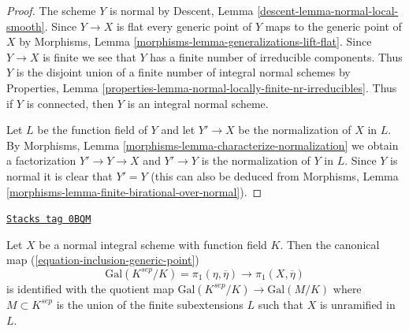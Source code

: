 \begin{proof}
The scheme $Y$ is normal by
Descent, Lemma \ref{descent-lemma-normal-local-smooth}.
Since $Y \to X$ is flat every generic point of $Y$ maps
to the generic point of $X$ by
Morphisms, Lemma \ref{morphisms-lemma-generalizations-lift-flat}.
Since $Y \to X$ is finite we see that $Y$ has a finite number
of irreducible components. Thus $Y$ is the disjoint union of
a finite number of integral normal schemes by
Properties, Lemma \ref{properties-lemma-normal-locally-finite-nr-irreducibles}.
Thus if $Y$ is connected, then $Y$ is an integral normal scheme.

\medskip\noindent
Let $L$ be the function field of $Y$ and let $Y' \to X$ be the normalization
of $X$ in $L$. By
Morphisms, Lemma \ref{morphisms-lemma-characterize-normalization}
we obtain a factorization $Y' \to Y \to X$ and $Y' \to Y$ is
the normalization of $Y$ in $L$. Since $Y$ is normal it is clear
that $Y' = Y$ (this can also be deduced from
Morphisms, Lemma \ref{morphisms-lemma-finite-birational-over-normal}).
\end{proof}

\begin{proposition}[Normal]
\label{pione-proposition-normal}
\href{https://stacks.math.columbia.edu/tag/0BQM}{\texttt{Stacks tag 0BQM}}

Let $X$ be a normal integral scheme with function field $K$.
Then the canonical map (\ref{equation-inclusion-generic-point})
$$
\text{Gal}(K^{sep}/K) = \pi_1(\eta, \overline{\eta})
\longrightarrow \pi_1(X, \overline{\eta})
$$
is identified with the quotient map
$\text{Gal}(K^{sep}/K) \to \text{Gal}(M/K)$ where $M \subset K^{sep}$
is the union of the finite subextensions $L$
such that $X$ is unramified in $L$.
\end{proposition}

